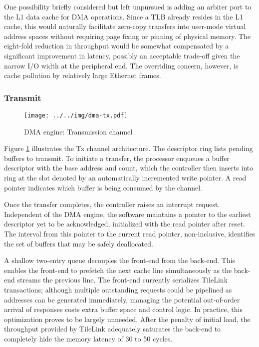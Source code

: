 One possibility briefly considered but left unpursued is adding an
arbiter port to the L1 data cache for DMA operations.
Since a TLB already resides in the L1 cache, this would naturally
facilitate zero-copy transfers into user-mode virtual address spaces
without requiring page fixing or pinning of physical memory.
The eight-fold reduction in throughput would be somewhat compensated by
a significant improvement in latency, possibly an acceptable trade-off
given the narrow I/O width at the peripheral end.
The overriding concern, however, is cache pollution by relatively large
Ethernet frames.

\subsubsection{Transmit}

\begin{figure}[b]
\begin{center}
\label{fig:dma-tx}
\texttt{[image: ../../img/dma-tx.pdf]}
\caption{DMA engine: Transmission channel}
\end{center}
\end{figure}

Figure \ref{fig:dma-tx} illustrates the Tx channel architecture.
The descriptor ring lists pending buffers to transmit.
To initiate a transfer, the processor enqueues a buffer descriptor with
the base address and count, which the controller then inserts into ring
at the slot denoted by an automatically incremented write pointer.
A read pointer indicates which buffer is being consumed by the channel.

Once the transfer completes, the controller raises an interrupt request.
Independent of the DMA engine, the software maintains a pointer to the
earliest descriptor yet to be acknowledged, initialized with the read
pointer after reset.
The interval from this pointer to the current read pointer,
non-inclusive, identifies the set of buffers that may be safely
deallocated.

A shallow two-entry queue decouples the front-end from the back-end.
This enables the front-end to prefetch the next cache line
simultaneously as the back-end streams the previous line.
The front-end currently serializes TileLink transactions;
although multiple outstanding requests could be pipelined as addresses
can be generated immediately, managing the potential out-of-order
arrival of responses costs extra buffer space and control logic.
In practice, this optimization proves to be largely unneeded.
After the penalty of initial load, the throughput provided by TileLink
adequately saturates the back-end to completely hide the memory latency
of 30 to 50 cycles.

